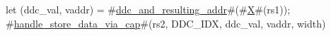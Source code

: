 let (ddc_val, vaddr) = #\hyperref[sailRISCVzddczyandzyresultingzyaddr]{ddc\_and\_resulting\_addr}#(#\hyperref[sailRISCVzX]{X}#(rs1));
#\hyperref[sailRISCVzhandlezystorezydatazyviazycap]{handle\_store\_data\_via\_cap}#(rs2, DDC_IDX, ddc_val, vaddr, width)
